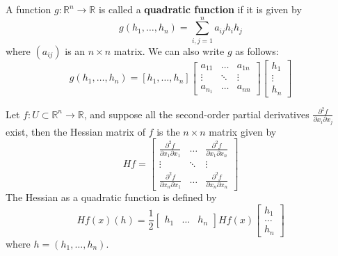 \documentclass[openany]{book}
\newcommand{\R}{\mathbb{R}}
\begin{document}
\begin{defn}
    A function $g:\R^n\to\R$ is called a \textbf{quadratic function} if it is given by 
    \begin{equation*}
        g(h_1,\dots, h_n)=\sum_{i,j=1}^na_{ij}h_ih_j
    \end{equation*}
    where $(a_{ij})$ is an $n\times n$ matrix. We can also write $g$ as follows:
    \begin{equation*}
        g(h_1,\dots,h_n)=[h_1,\dots,h_n]\begin{bmatrix}
            a_{11}&\dots &a_{1n}\\
            \vdots&\ddots &\vdots\\
            a_{n_1}&\dots&a_{nn}
        \end{bmatrix}\begin{bmatrix}
            h_1\\
            \vdots\\
            h_n
        \end{bmatrix}
    \end{equation*}

\end{defn}

\begin{defn}
    Let $f:U\subset\R^n\to\R$, and suppose all the second-order partial derivatives $\frac{\partial^2 f}{\partial x_i\partial x_j}$ exist, then the Hessian matrix of $f$ is the $n\times n$ matrix given by 
    \begin{equation*}
        Hf=\begin{bmatrix}
            \frac{\partial^2 f}{\partial x_1\partial x_1}&\dots&\frac{\partial^2f}{\partial x_1\partial x_n}\\
            \vdots&\ddots&\vdots\\
            \frac{\partial^2f}{\partial x_n\partial x_1}&\dots&\frac{\partial^2f}{\partial x_n\partial x_n}
        \end{bmatrix}
    \end{equation*}
    The Hessian as a quadratic function is defined by 
    \begin{equation*}
        Hf(x)(h)=\frac{1}{2}\begin{bmatrix}
            h_1&\dots&h_n
        \end{bmatrix}Hf(x)\begin{bmatrix}
            h_1\\
            \dots\\
            h_n
        \end{bmatrix}
    \end{equation*}
    where $h=(h_1,\dots,h_n)$.
\end{defn}
\end{document}
